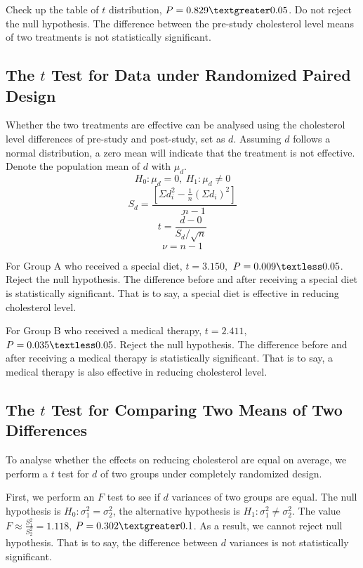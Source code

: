\documentclass[11pt,a4paper,onside,UTF8]{article}
\begin{document}
Check up the table of $t$ distribution, $P = 0.829 \textgreater 0.05$. Do not reject the null hypothesis.
The difference between the pre-study cholesterol level means of two treatments is not statistically significant.
 
\subsection{The $t$ Test for Data under Randomized Paired Design}
Whether the two treatments are effective can be analysed using the cholesterol level differences of pre-study and post-study, set as $d$.
Assuming $d$ follows a normal distribution, a zero mean will indicate that the treatment is not effective.
Denote the population mean of $d$ with $\mu_d$.
\begin{equation}
	H_0: \mu_d=0, \ H_1: \mu_d \neq 0
\end{equation}
\begin{equation}
	S_d=\frac{\left[\Sigma d_i^2-\frac{1}{n}\left(\Sigma d_i\right)^2\right]}{n-1}
\end{equation}
\begin{equation}
	t=\frac{\bar{d}-0}{S_d/\sqrt{n}}
\end{equation}
\begin{equation}
	\nu=n-1
\end{equation}

For Group A who received a special diet, $t=3.150,$ $P=0.009 \textless 0.05$. Reject the null hypothesis.
The difference before and after receiving a special diet is statistically significant. That is to say, a special diet is effective in reducing cholesterol level. 

For Group B who received a medical therapy, $t=2.411,$ $P=0.035 \textless 0.05$. Reject the null hypothesis.
The difference before and after receiving a medical therapy is statistically significant. That is to say, a medical therapy is also effective in reducing cholesterol level. 

\subsection{The $t$ Test for Comparing Two Means of Two Differences}
To analyse whether the effects on reducing cholesterol are equal on average, 
we perform a $t$ test for $d$ of two groups under completely randomized design.

First, we perform an $F$ test to see if $d$ variances of two groups are equal.
The null hypothesis is $H_0: \sigma_1^2=\sigma_2^2$, the alternative hypothesis is $H_1: \sigma_1^2 \neq \sigma_2^2$. 
The value $F\approx \frac{S_1^2}{S_2^2} = 1.118$, $P=0.302 \textgreater 0.1$.
As a result, we cannot reject null hypothesis. That is to say, the difference between $d$ variances is not statistically significant.
\end{document}
